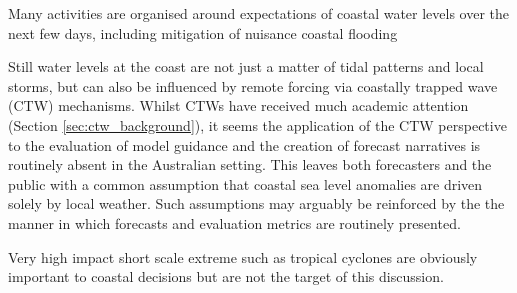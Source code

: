 Many activities are organised around expectations of coastal water levels over the next few days, including mitigation of  nuisance coastal flooding \citep{Sweet:2014ss, Hague:2019ha}

Still water levels \citep{Pugh:2014di} at the coast are not just a matter of tidal patterns and local storms, but can also be influenced by remote forcing via coastally trapped wave (CTW) mechanisms.
Whilst CTWs have received much academic attention (Section \ref{sec:ctw_background}), it seems the application of the CTW perspective to the evaluation of model guidance and the creation of forecast narratives is routinely absent in the Australian setting. 
This leaves both forecasters and the public with a common assumption that coastal sea level anomalies are driven solely by local weather. Such assumptions may arguably be reinforced by the the manner in which forecasts and evaluation metrics are routinely presented.

Very high impact short scale extreme such as tropical cyclones \citep{McInnes:2016km} are obviously important to coastal decisions but are not the target of this discussion. 


